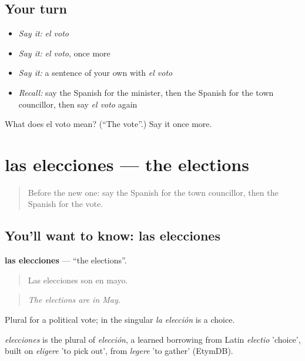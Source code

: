 \subsection*{Your turn}
\begin{itemize}
\raggedright
  \item \emph{Say it:} \emph{el voto}
  \item \emph{Say it:} \emph{el voto}, once more
  \item \emph{Say it:} a sentence of your own with \emph{el voto}
  \item \emph{Recall:} say the Spanish for the minister, then the Spanish for the town councillor, then say \emph{el voto} again
\end{itemize}

\begin{tcolorbox}[breakable,colback=teal!4,colframe=teal!35!black,title={Before you move on}]
What does el voto mean? (\textquotedblleft{}The vote\textquotedblright{}.) Say it once more.
\end{tcolorbox}
\section[las elecciones]{las elecciones — the elections}

\label{lesson:ES-C602-elecciones}



\begin{quote}
Before the new one: say the Spanish for the town councillor, then the Spanish for the vote.
\end{quote}

\subsection*{You'll want to know: las elecciones}
\textbf{las elecciones} — \textquotedblleft{}the elections\textquotedblright{}.

\begin{quote}
Las elecciones son en mayo.
\end{quote}

\begin{quote}
\emph{The elections are in May.}
\end{quote}

Plural for a political vote; in the singular \emph{la elección} is a choice.

\begin{cousinweb}
\emph{elecciones} is the plural of \emph{elección}, a learned borrowing from Latin \emph{electio} 'choice', built on \emph{eligere} 'to pick out', from \emph{legere} 'to gather' (EtymDB).
\end{cousinweb}

